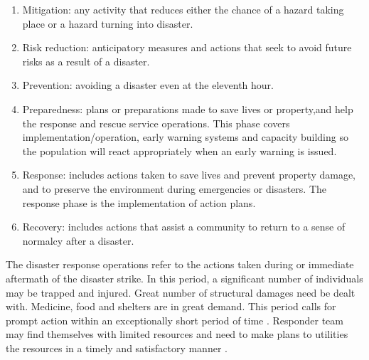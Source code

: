 \begin{enumerate}
\item Mitigation: any activity that reduces either the chance of a hazard taking place or a hazard turning into disaster.
\item Risk reduction: anticipatory measures and actions that seek to avoid future risks as a result of a disaster.
\item Prevention: avoiding a disaster even at the eleventh hour. 
\item Preparedness: plans or preparations made to save lives or property,and help the response and rescue service operations. This phase covers implementation/operation, early warning systems and capacity building so the population will react appropriately when an early warning is issued.
\item Response: includes actions taken to save lives and prevent property damage, and to preserve the environment during emergencies or disasters. The response phase is the implementation of action plans.
\item Recovery: includes actions that assist a community to return to a sense of normalcy after a disaster.
\end{enumerate}

The disaster response operations refer to the actions taken during or immediate aftermath of the disaster strike. In this period, a significant number of individuals may be trapped and injured. Great number of structural damages need be dealt with. Medicine, food and shelters are in great demand. This period calls for prompt action within an exceptionally short period of time \cite{Wattegama2012}. Responder team may find themselves with limited resources and need to make plans to utilities the resources in a timely and satisfactory manner \cite{Chen2005,Chen2008}. \\



